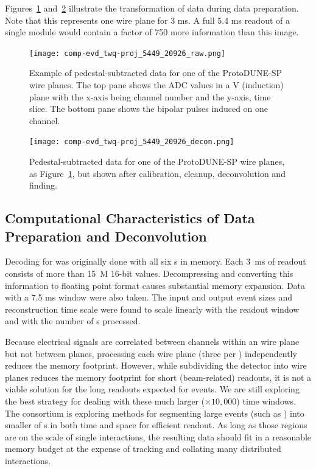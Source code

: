 Figures~\ref{fig:ch-exec-comp-chtraw} and~\ref{fig:ch-exec-comp-chtroi} illustrate the transformation of  data  during data preparation. Note that this represents one wire plane for 3 ms.  A full 5.4 ms readout of a single \nominalmodsize module would contain a factor of 750  more information than this image.

\begin{figure}[t]
\texttt{[image: comp-evd\_twq-proj\_5449\_20926\_raw.png]}
\caption[Example of pedestal-subtracted data for one of the ProtoDUNE-SP  wire planes]{Example of pedestal-subtracted data for one of the ProtoDUNE-SP  wire planes.  The top pane shows the ADC values in a V (induction) plane with the x-axis being channel number and the y-axis, time slice. The bottom pane shows the bipolar pulses induced on one channel. 
}
\label{fig:ch-exec-comp-chtraw}
\end{figure}


\begin{figure}[t]
 \texttt{[image: comp-evd\_twq-proj\_5449\_20926\_decon.png]}
\caption[Pedestal-subtracted data for one of the ProtoDUNE-SP  wire planes, additional processing]{
Pedestal-subtracted data for one of the ProtoDUNE-SP  wire planes, as Figure~\ref{fig:ch-exec-comp-chtraw}, but shown after calibration, cleanup, deconvolution and  finding. 
}
\label{fig:ch-exec-comp-chtroi}
\end{figure}


\subsection{Computational Characteristics of Data Preparation and Deconvolution }

Decoding for  was originally done with all six s in memory. Each \SI{3}{ms} of  readout consists of more than \SI{15}{M} 16-bit values. Decompressing and converting this information to floating point format causes substantial memory expansion. 
  Data with a 7.5 ms window were also taken. 
The input and output event sizes and reconstruction time scale were found to scale linearly with the readout window and with the number of s processed. 


Because electrical signals are correlated between channels within an  wire plane but not between planes, processing each wire plane (three per ) independently reduces the memory footprint.
However,  while subdividing the detector into wire planes reduces the memory footprint for short (beam-related) readouts, it is  not a viable solution for the long readouts expected for  events. We are still exploring the best strategy for dealing with these much larger ($\times 10,000$) time windows. 
The  consortium is exploring methods for segmenting large events (such as ) into  smaller of s in both time and space for efficient readout.  As long as those regions are on the scale of single interactions, the resulting data should fit in a reasonable memory budget at the expense of tracking and collating many distributed interactions. 

